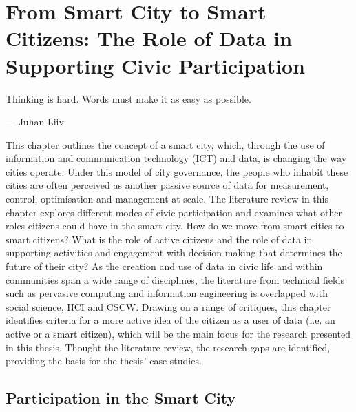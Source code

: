 
\chapter[Literature Review]{From Smart City to Smart Citizens: The Role of Data in Supporting Civic Participation}
\label{chap:literature}

\ifpdf
    \graphicspath{{Chapter1/Figs/Raster/}{Chapter1/Figs/PDF/}{Chapter1/Figs/}}
\else
    \graphicspath{{Chapter1/Figs/Vector/}{Chapter1/Figs/}}
\fi

\epigraph{Thinking is hard. Words must make it as easy as possible.}{--- \textup{Juhan Liiv}}

This chapter outlines the concept of a smart city, which, through the use of information and communication technology (ICT) and data, is changing the way cities operate. Under this model of city governance, the people who inhabit these cities are often perceived as another passive source of data for measurement, control, optimisation and management at scale. The literature review in this chapter explores different modes of civic participation and examines what other roles citizens could have in the smart city. How do we move from smart cities to smart citizens? What is the role of active citizens and the role of data in supporting activities and engagement with decision-making that determines the future of their city? As the creation and use of data in civic life and within communities span a wide range of disciplines, the literature from technical fields such as pervasive computing and information engineering is overlapped with social science, HCI and CSCW. Drawing on a range of critiques, this chapter identifies criteria for a more active idea of the citizen as a user of data (i.e. an active or a smart citizen), which will be the main focus for the research presented in this thesis. Thought the literature review, the research gaps are identified, providing the basis for the thesis' case studies. 
\clearpage

\section{Participation in the Smart City}
\label{smart-city}
